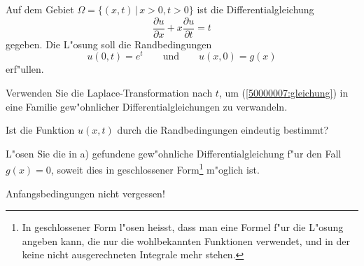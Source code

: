 Auf dem Gebiet $\Omega=\{(x,t)\,|\, x>0,t > 0\}$
ist die Differentialgleichung
\begin{equation}
\frac{\partial u}{\partial x}+x\frac{\partial u}{\partial t}=t
\label{50000007:gleichung}
\end{equation}
gegeben. Die L"osung soll die Randbedingungen
\[
u(0,t)=e^t
\qquad
\text{und}
\qquad
u(x,0)=g(x)
\]
erf"ullen.
\begin{teilaufgaben}
\item Verwenden Sie die Laplace-Transformation nach $t$,
um (\ref{50000007:gleichung}) in eine Familie gew"ohnlicher
Differentialgleichungen zu verwandeln.
\item
Ist die Funktion $u(x,t)$ durch die Randbedingungen eindeutig bestimmt?
\item
L"osen Sie die in a) gefundene gew"ohnliche Differentialgleichung f"ur den Fall
$g(x)=0$, soweit dies in geschlossener Form\footnote{In geschlossener Form
l"osen heisst, dass man eine Formel f"ur die L"osung angeben kann, die 
nur die wohlbekannten Funktionen verwendet, und in der keine nicht
ausgerechneten Integrale mehr stehen.
} m"oglich ist.
\end{teilaufgaben}

\begin{hinweis}
Anfangsbedingungen nicht vergessen!
\end{hinweis}

